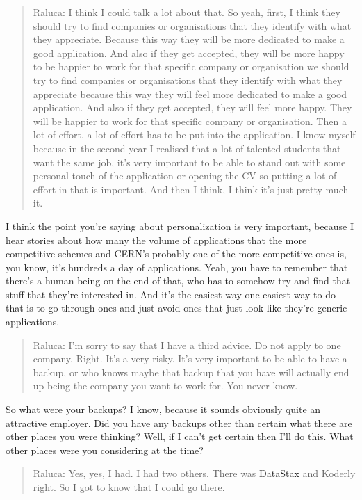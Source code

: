\documentclass[
]{book}
\begin{document}
\begin{quote}
Raluca: I think I could talk a lot about that. So yeah, first, I think they should try to find companies or organisations that they identify with what they appreciate. Because this way they will be more dedicated to make a good application. And also if they get accepted, they will be more happy to be happier to work for that specific company or organisation we should try to find companies or organisations that they identify with what they appreciate because this way they will feel more dedicated to make a good application. And also if they get accepted, they will feel more happy. They will be happier to work for that specific company or organisation. Then a lot of effort, a lot of effort has to be put into the application. I know myself because in the second year I realised that a lot of talented students that want the same job, it's very important to be able to stand out with some personal touch of the application or opening the CV so putting a lot of effort in that is important. And then I think, I think it's just pretty much it.
\end{quote}

I think the point you're saying about personalization is very important, because I hear stories about how many the volume of applications that the more competitive schemes and CERN's probably one of the more competitive ones is, you know, it's hundreds a day of applications. Yeah, you have to remember that there's a human being on the end of that, who has to somehow try and find that stuff that they're interested in. And it's the easiest way one easiest way to do that is to go through ones and just avoid ones that just look like they're generic applications.

\begin{quote}
Raluca: I'm sorry to say that I have a third advice. Do not apply to one company. Right. It's a very risky. It's very important to be able to have a backup, or who knows maybe that backup that you have will actually end up being the company you want to work for. You never know.
\end{quote}

So what were your backups? I know, because it sounds obviously quite an attractive employer. Did you have any backups other than certain what there are other places you were thinking? Well, if I can't get certain then I'll do this. What other places were you considering at the time?

\begin{quote}
Raluca: Yes, yes, I had. I had two others. There was \href{https://en.wikipedia.org/wiki/DataStax}{DataStax} and Koderly right. So I got to know that I could go there.
\end{quote}
\end{document}
